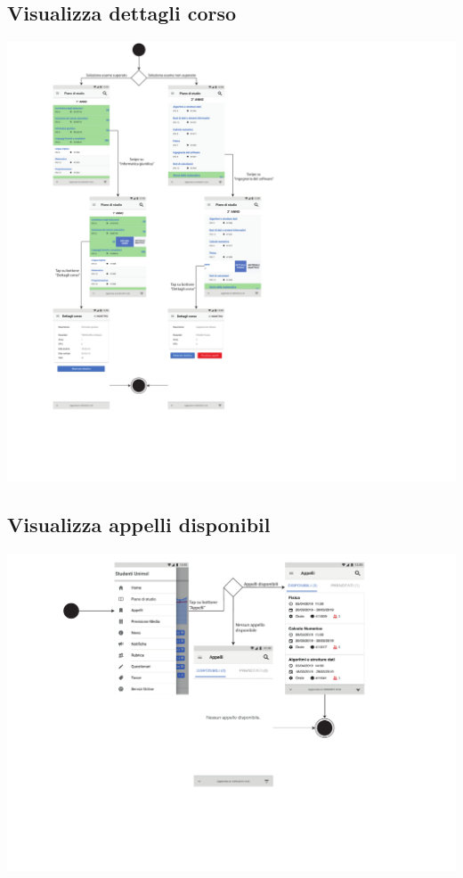 \subsection{Visualizza dettagli corso}
\begin{center}
	\includegraphics[width=7in]{imgs/gruppo1/activity_diagrams/AD5_visualizza_dettagli_corso.pdf}
\end{center}
\newpage


\subsection{Visualizza appelli disponibil}
\begin{center}
	\includegraphics[width=6in]{imgs/gruppo1/activity_diagrams/AD6_visualizza_appelli_disponibili.pdf}
\end{center}
\newpage

